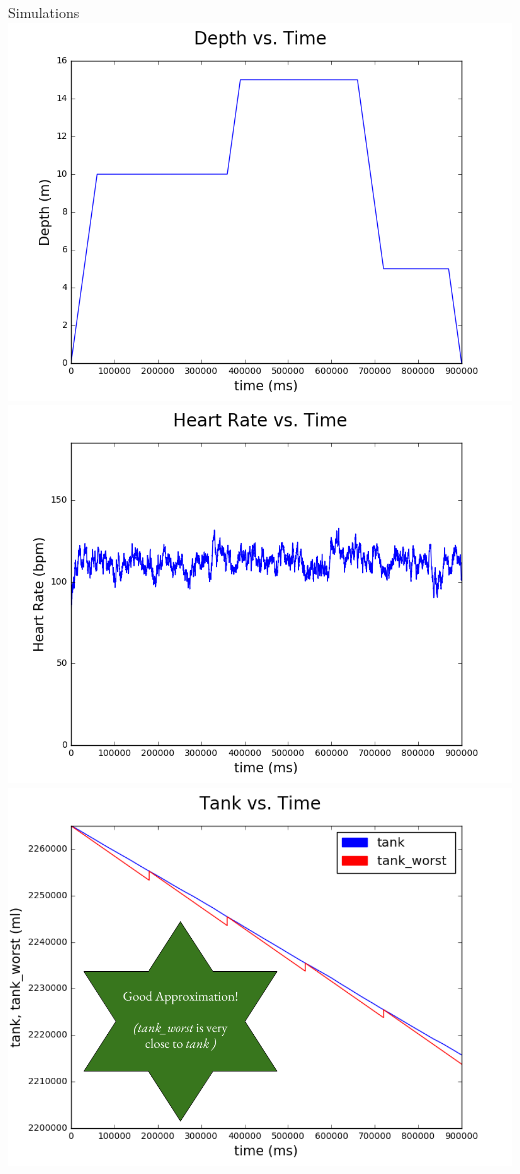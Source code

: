\documentclass[final]{beamer}
\theoremstyle{definition}
\begin{document}
\begin{frame}[fragile]
\begin{textblock}{51}
\begin{block}{Simulations}
\vspace{5mm}
\includegraphics[scale=.8]{images/depthDynamics_15min.png}\hspace{5mm}
\includegraphics[scale=.8]{images/hrDynamics_15min.png}\hspace{5mm}
\includegraphics[scale=.48]{images/_tankDynamics(1).png}


\end{block}
\end{textblock}
\end{frame}
\end{document}
